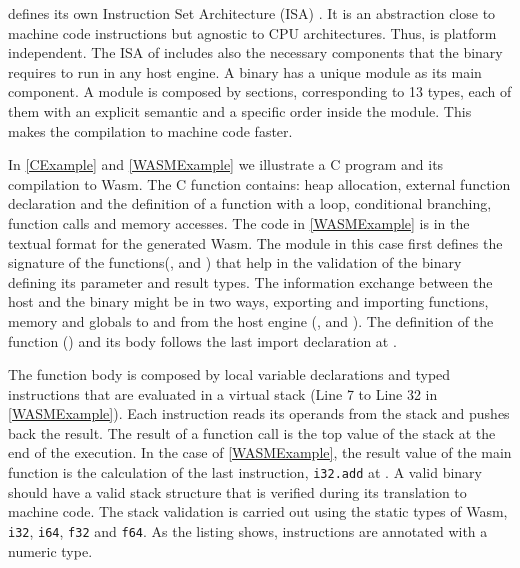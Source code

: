 \wasm defines its own Instruction Set Architecture (ISA) \cite{wasm_spec}. It is an abstraction close to machine code instructions but agnostic to CPU architectures. Thus, is platform independent. The ISA of includes also the necessary components that the binary requires to run in any host engine. 
A binary has a unique module as its main component. A module is composed by sections, corresponding to 13 types, each of them with an explicit semantic and a specific order inside the module. This makes the compilation to machine code faster. %


In \autoref{CExample} and \autoref{WASMExample} we illustrate a C program and its compilation to Wasm. The C function contains: heap allocation, external function declaration and the definition of a function with a loop, conditional branching, function calls and memory accesses. The code in \autoref{WASMExample} is in the textual format for the generated Wasm. The module in this case first defines the signature of the functions(,   and  )  that help in the validation of the binary defining its parameter and result types. The information exchange between the host and the binary might be in two ways, exporting and importing functions, memory and globals to and from the host engine (,  and ). The definition of the function () and its body follows the last import declaration at . 

The function body is composed by local variable declarations and typed instructions that are evaluated in a virtual stack (Line 7 to Line 32 in \autoref{WASMExample}). Each instruction reads its operands from the stack and pushes back the result. The result of a function call is the top value of the stack at the end of the execution. In the case of \autoref{WASMExample}, the result value of the main function is the calculation of the last instruction, \texttt{i32.add} at . A valid binary should have a valid stack structure that is verified during its translation to machine code. The stack validation is carried out using the static types of Wasm, \texttt{i32}, \texttt{i64}, \texttt{f32} and \texttt{f64}. As the listing shows, instructions are annotated with a numeric type.

